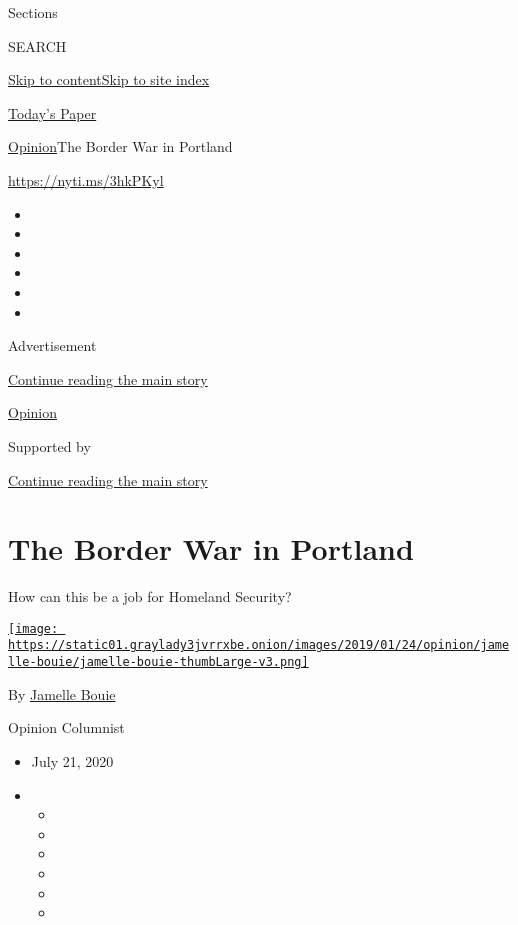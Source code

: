 Sections

SEARCH

\protect\hyperlink{site-content}{Skip to
content}\protect\hyperlink{site-index}{Skip to site index}

\href{https://myaccount.nytimes3xbfgragh.onion/auth/login?response_type=cookie\&client_id=vi}{}

\href{https://www.nytimes3xbfgragh.onion/section/todayspaper}{Today's
Paper}

\href{/section/opinion}{Opinion}\textbar{}The Border War in Portland

\url{https://nyti.ms/3hkPKyl}

\begin{itemize}
\item
\item
\item
\item
\item
\item
\end{itemize}

Advertisement

\protect\hyperlink{after-top}{Continue reading the main story}

\href{/section/opinion}{Opinion}

Supported by

\protect\hyperlink{after-sponsor}{Continue reading the main story}

\hypertarget{the-border-war-in-portland}{%
\section{The Border War in Portland}\label{the-border-war-in-portland}}

How can this be a job for Homeland Security?

\href{https://www.nytimes3xbfgragh.onion/column/jamelle-bouie}{\texttt{[image: https://static01.graylady3jvrrxbe.onion/images/2019/01/24/opinion/jamelle-bouie/jamelle-bouie-thumbLarge-v3.png]}}

By
\href{https://www.nytimes3xbfgragh.onion/column/jamelle-bouie}{Jamelle
Bouie}

Opinion Columnist

\begin{itemize}
\item
  July 21, 2020
\item
  \begin{itemize}
  \item
  \item
  \item
  \item
  \item
  \item
  \end{itemize}
\end{itemize}

